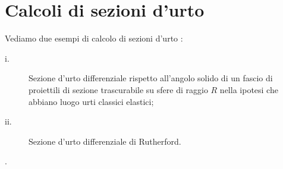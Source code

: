 \section{Calcoli di sezioni d'urto}\label{sec:calcoli-di-sezioni-d'urto}
Vediamo due esempi di calcolo di sezioni d'urto :
\begin{description}
	\item[i.] Sezione d'urto differenziale rispetto all'angolo solido di un fascio di proiettili di sezione trascurabile su sfere di raggio $R$ nella ipotesi che abbiano luogo urti classici elastici;
	\item[ii.] Sezione d'urto differenziale di Rutherford.
\end{description}

. \\

